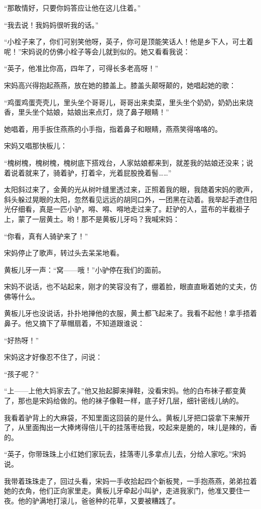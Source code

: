 \par “那敢情好，只要你妈答应让他在这儿住着。”
\par “我去说！我妈妈很听我的话。”
\par “小栓子来了，你们可别笑他呀，英子，你可是顶能笑话人！他是乡下人，可土着呢！”宋妈说的仿佛小栓子等会儿就到似的。她又看看我说：
\par “英子，他准比你高，四年了，可得长多老高呀！”
\par 宋妈高兴得抱起燕燕，放在她的膝盖上。膝盖头颠呀颠的，她唱起她的歌：
\par “鸡蛋鸡蛋壳壳儿，里头坐个哥哥儿，哥哥出来卖菜，里头坐个奶奶，奶奶出来烧香，里头坐个姑娘，姑娘出来点灯，烧了鼻子眼睛！”
\par 她唱着，用手扳住燕燕的小手指，指着鼻子和眼睛，燕燕笑得咯咯的。
\par 宋妈又唱那快板儿：
\par “槐树槐，槐树槐，槐树底下搭戏台，人家姑娘都来到，就差我的姑娘还没来；说着说着就来了，骑着驴，打着伞，光着屁股挽着髻……”
\par 太阳斜过来了，金黄的光从树叶缝里透过来，正照着我的眼，我随着宋妈的歌声，斜头躲过晃眼的太阳，忽然看见远远的胡同口外，一团黑在动着。我举起手遮住阳光仔细看，真是一匹小驴，嘚、嘚、嘚地走过来了。赶驴的人，蓝布的半截褂子上，蒙了一层黄土。哟！那不是黄板儿牙吗？我喊宋妈：
\par “你看，真有人骑驴来了！”
\par 宋妈停止了歌声，转过头去呆呆地看。
\par 黄板儿牙一声：“窝——哦！”小驴停在我们的面前。
\par 宋妈不说话，也不站起来，刚才的笑容没有了，绷着脸，眼直直瞅着她的丈夫，仿佛等什么。
\par 黄板儿牙也没说话，扑扑地掸他的衣服，黄土都飞起来了。我看不起他！拿手捂着鼻子。他又摘下了草帽扇着，不知道跟谁说：
\par “好热呀！”
\par 宋妈这才好像忍不住了，问说：
\par “孩子呢？”
\par “上——上他大妈家去了。”他又抬起脚来掸鞋，没看宋妈。他的白布袜子都变黄了，那也是宋妈给做的。他的袜子像鞋一样，底子好几层，细针密线儿纳的。
\par 我看着驴背上的大麻袋，不知里面这回装的是什么。黄板儿牙把口袋拿下来解开了，从里面掏出一大捧烤得倍儿干的挂落枣给我，咬起来是脆的，味儿是辣的，香的。
\par “英子，你带珠珠上小红她们家玩去，挂落枣儿多拿点儿去，分给人家吃。”宋妈说。
\par 我带着珠珠走了，回过头看，宋妈一手收拾起四个新板凳，一手抱燕燕，弟弟拉着她的衣角，他们正向家里走。黄板儿牙牵起小叫驴，走进我家门，他准又要住一夜。他的驴满地打滚儿，爸爸种的花草，又要被糟践了。

